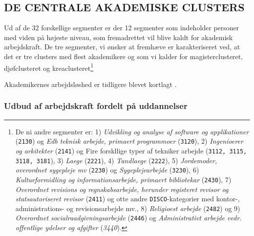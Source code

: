 




\subsection{DE CENTRALE AKADEMISKE CLUSTERS \label{}}

Ud af de 32 forskellige segmenter er der 12 segmenter som indeholder personer med viden på højeste niveau, som fremadrettet vil blive kaldt for akademisk arbejdskraft. De tre segmenter, vi ønsker at fremhæve er karakteriseret ved, at det er tre clusters med flest akademikere og som vi kalder for magisterclusteret, djøfclusteret og kreaclusteret\footnote{De ni andre segmenter er: 1) \emph{Udvikling og analyse af software og applikationer} (\texttt{2130}) og \emph{Edb teknisk arbejde, primaert programmoer} (\texttt{3120}), 2) \emph{Ingenioerer og arkitekter} (\texttt{2141}) og Fire forskllige typer af tekniker arbejde (\texttt{3112, 3115, 3118, 3181}), 3) \emph{Laege} (\texttt{2221}), 4) \emph{Tandlaege} (\texttt{2222}), 5) \emph{Jordemoder, overordnet sygepleje mv} (\texttt{2230}) og \emph{Sygeplejearbejde} (\texttt{3230}), 6) \emph{Kulturformidling og informationsarbejde, primaert bibliotekar} (\texttt{2430}), 7) \emph{Overordnet revisions og regnskabsarbejde, herunder registeret revisor og statsautoriseret revisor} (\texttt{2411}) og otte andre \texttt{DISCO}-kategorier med kontor-, administrations- og revisionsarbejde mv., 8) \emph{Religioest arbejde} (\texttt{2482}) og 9) \emph{Overordnet socialraadgivningsarbejde} (\texttt{2446}) og \emph{Administrativt arbejde vedr. offentlige ydelser og afgifter} (\emph{3440}).}

Akademikernes arbejdsløshed er tidligere blevet kortlagt \parencite{Groes2014}.




\subsubsection{Udbud af arbejdskraft fordelt på uddannelser \label{}}

